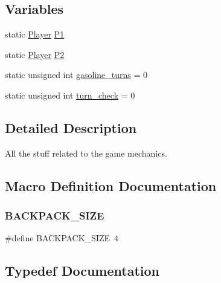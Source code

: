 \subsection*{Variables}
\begin{DoxyCompactItemize}
\item 
static \hyperlink{group__game_gac6f795d0d2e88ee469ddc704329e7cc3}{Player} \hyperlink{group__game_gaccc5007b929ad581c10681547209a8e9}{P1}
\item 
static \hyperlink{group__game_gac6f795d0d2e88ee469ddc704329e7cc3}{Player} \hyperlink{group__game_ga7a9af78ed6216215319101be23aa592d}{P2}
\item 
static unsigned int \hyperlink{group__game_gab559443974aa82448752226204355810}{gasoline\+\_\+turns} = 0
\item 
static unsigned int \hyperlink{group__game_ga5a8c0b139e420a30cda9ed86109502d7}{turn\+\_\+check} = 0
\end{DoxyCompactItemize}


\subsection{Detailed Description}
All the stuff related to the game mechanics. 

\subsection{Macro Definition Documentation}
\mbox{\label{group__game_gac25e6ef3ae2779588d3e1fbced1e8ceb}} 
\subsubsection{\texorpdfstring{B\+A\+C\+K\+P\+A\+C\+K\+\_\+\+S\+I\+ZE}{BACKPACK\_SIZE}}
{\footnotesize\ttfamily \#define B\+A\+C\+K\+P\+A\+C\+K\+\_\+\+S\+I\+ZE~4}



\subsection{Typedef Documentation}
\mbox{\label{group__game_gac6f795d0d2e88ee469ddc704329e7cc3}} 
